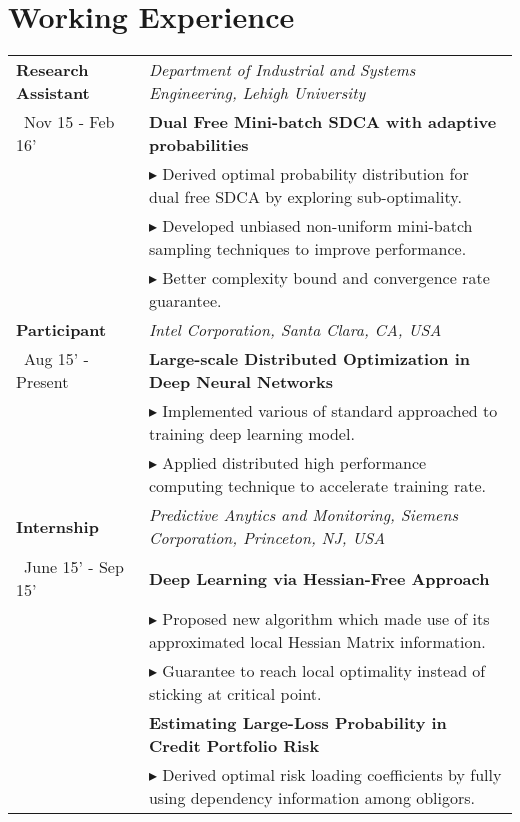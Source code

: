 \documentclass[a4paper,11pt]{article} %
\newcommand{\lst}[1]{\quad\footnotesize{$\blacktriangleright$ #1.}}
\begin{document}
\section{Working Experience}
\begin{longtable}{>{\centering}p{3.35cm}|p{14cm}}
    \small{\textbf{Research Assistant}}& \textit{Department of Industrial and Systems Engineering, Lehigh University}\\\
    \small{Nov 15 - Feb 16'}&\textbf{Dual Free Mini-batch SDCA with adaptive probabilities}\\ 
    & \lst{Derived optimal probability distribution for dual free SDCA by exploring sub-optimality}\\
        &\lst {Developed unbiased non-uniform mini-batch sampling techniques to improve performance}\\
 & \lst{Better complexity bound and convergence rate guarantee}\\
    \small{\textbf{Participant}}& \textit{Intel Corporation, Santa Clara, CA, USA}\\\
    \small{Aug 15' - Present}&\textbf{Large-scale Distributed Optimization in Deep Neural Networks}\\ 
    & \lst{Implemented various of standard approached to training deep learning model}\\
    &\lst {Applied distributed high performance computing technique to accelerate training rate}\\
    \small{\textbf{Internship}}& \textit{Predictive Anytics and Monitoring, Siemens Corporation, Princeton, NJ, USA}\\\
    \small{June 15' - Sep 15'}&\textbf{Deep Learning via Hessian-Free Approach}\\
    & \lst{Proposed new algorithm which made use of its approximated local Hessian Matrix information}\\
    &\lst{Guarantee to reach local optimality instead of sticking at critical point}\\
    & \textbf{Estimating Large-Loss Probability in Credit Portfolio Risk}   \\
    &  \lst{Derived optimal risk loading coefficients by fully using dependency information among obligors}\\

\end{longtable}
\end{document}
